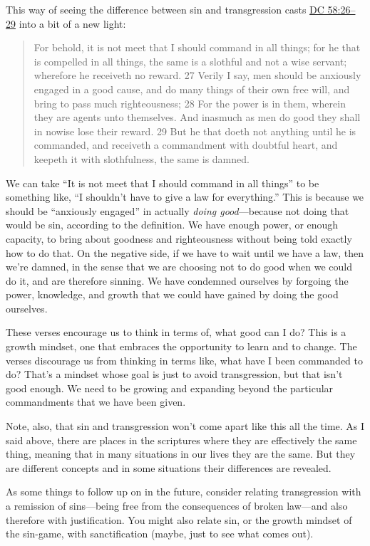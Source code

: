 		This way of seeing the difference between sin and transgression casts \hyperref[DC58-26]{DC 58:26--29} into a bit of a new light:
		
			\begin{quote}
				For behold, it is not meet that I should command in all things; for he that is compelled in all things, the same is a slothful and not a wise servant; wherefore he receiveth no reward.
				27 Verily I say, men should be anxiously engaged in a good cause, and do many things of their own free will, and bring to pass much righteousness;
				28 For the power is in them, wherein they are agents unto themselves. And inasmuch as men do good they shall in nowise lose their reward.
				29 But he that doeth not anything until he is commanded, and receiveth a commandment with doubtful heart, and keepeth it with slothfulness, the same is damned.
			\end{quote}
			
		We can take ``It is not meet that I should command in all things'' to be something like, ``I shouldn't have to give a law for everything.'' This is because we should be ``anxiously engaged'' in actually \textit{doing good}---because not doing that would be sin, according to the definition. We have enough power, or enough capacity, to bring about goodness and righteousness without being told exactly how to do that. On the negative side, if we have to wait until we have a law, then we're damned, in the sense that we are choosing not to do good when we could do it, and are therefore sinning. We have condemned ourselves by forgoing the power, knowledge, and growth that we could have gained by doing the good ourselves.
		
		These verses encourage us to think in terms of, what good can I do? This is a growth mindset, one that embraces the opportunity to learn and to change. The verses discourage us from thinking in terms like, what have I been commanded to do? That's a mindset whose goal is just to avoid transgression, but that isn't good enough. We need to be growing and expanding beyond the particular commandments that we have been given. 
		
		Note, also, that sin and transgression won't come apart like this all the time. As I said above, there are places in the scriptures where they are effectively the same thing, meaning that in many situations in our lives they are the same. But they are different concepts and in some situations their differences are revealed.
		
		As some things to follow up on in the future, consider relating transgression with a remission of sins---being free from the consequences of broken law---and also therefore with justification. You might also relate sin, or the growth mindset of the sin-game, with sanctification (maybe, just to see what comes out).